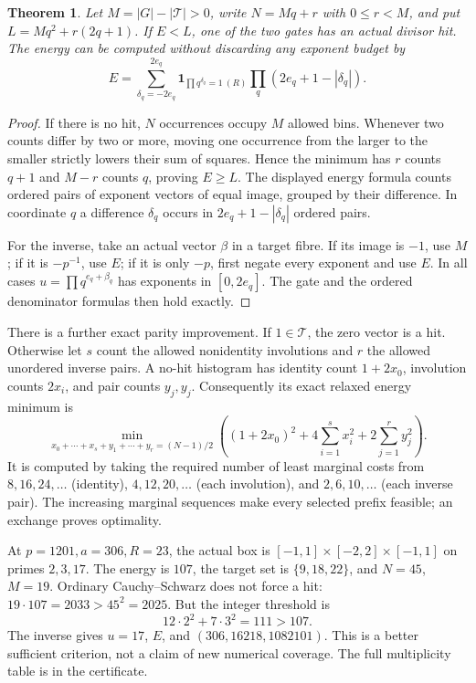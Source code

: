 \documentclass[11pt]{amsart}
\newtheorem{theorem}{Theorem}\newtheorem{proposition}[theorem]{Proposition}
\begin{document}
\begin{theorem}
Let $M=|G|-|\mathcal T|>0$, write $N=Mq+r$ with $0\le r<M$, and put
$L=Mq^2+r(2q+1)$. If $E<L$, one of the two gates has an actual divisor hit.
The energy can be computed without discarding any exponent budget by
\[
 E=\sum_{\delta_q=-2e_q}^{2e_q}
 \mathbf1_{\prod q^{\delta_q}=1\ (R)}
 \prod_q(2e_q+1-|\delta_q|).
\]
\end{theorem}
\begin{proof}
If there is no hit, $N$ occurrences occupy $M$ allowed bins. Whenever two
counts differ by two or more, moving one occurrence from the larger to the
smaller strictly lowers their sum of squares. Hence the minimum has $r$
counts $q+1$ and $M-r$ counts $q$, proving $E\ge L$.
The displayed energy formula counts ordered pairs of exponent vectors of
equal image, grouped by their difference. In coordinate $q$ a difference
$\delta_q$ occurs in $2e_q+1-|\delta_q|$ ordered pairs.

For the inverse, take an actual vector $\beta$ in a target fibre. If its
image is $-1$, use $M$; if it is $-p^{-1}$, use $E$; if it is only $-p$,
first negate every exponent and use $E$. In all cases
$u=\prod q^{e_q+\beta_q}$ has exponents in $[0,2e_q]$. The gate and the
ordered denominator formulas then hold exactly.
\end{proof}

There is a further exact parity improvement. If $1\in\mathcal T$, the
zero vector is a hit. Otherwise let $s$ count the allowed nonidentity
involutions and $r$ the allowed unordered inverse pairs. A no-hit histogram
has identity count $1+2x_0$, involution counts $2x_i$, and pair counts $y_j,y_j$.
Consequently its exact relaxed energy minimum is
\[
 \min_{x_0+\cdots+x_s+y_1+\cdots+y_r=(N-1)/2}
 \left((1+2x_0)^2+4\sum_{i=1}^sx_i^2+2\sum_{j=1}^ry_j^2\right).
\]
It is computed by taking the required number of least marginal costs from
$8,16,24,\ldots$ (identity), $4,12,20,\ldots$ (each involution),
and $2,6,10,\ldots$ (each inverse pair). The increasing marginal sequences
make every selected prefix feasible; an exchange proves optimality.

At $p=1201,a=306,R=23$, the actual box is
$[-1,1]\times[-2,2]\times[-1,1]$ on primes $2,3,17$.
The energy is $107$, the target set is $\{9,18,22\}$, and
$N=45$, $M=19$. Ordinary Cauchy--Schwarz does not force a hit:
$19\cdot107=2033>45^2=2025$.
But the integer threshold is
\[
 12\cdot2^2+7\cdot3^2=111>107.
\]
The inverse gives $u=17$, $E$, and
$(306,16218,1082101)$. This is a better sufficient criterion, not a claim
of new numerical coverage. The full multiplicity table is in the certificate.
\end{document}
